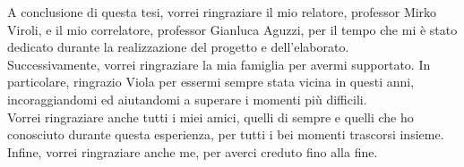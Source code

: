 \documentclass[12pt,a4paper,openright,twoside]{book}
\begin{document}

\backmatter



\begin{acknowledgements}
    A conclusione di questa tesi, vorrei ringraziare il mio relatore, professor Mirko Viroli, e il mio correlatore, professor Gianluca 
    Aguzzi, per il tempo che mi è stato dedicato durante la realizzazione del progetto e dell'elaborato.\\ Successivamente, vorrei ringraziare 
    la mia famiglia per avermi supportato. In particolare, ringrazio Viola per essermi sempre stata vicina in questi anni, incoraggiandomi 
    ed aiutandomi a superare i momenti più difficili.\\ Vorrei ringraziare anche tutti i miei amici, quelli di sempre e quelli 
    che ho conosciuto durante questa esperienza, per tutti i bei momenti trascorsi insieme.\\
    Infine, vorrei ringraziare anche me, per averci creduto fino alla fine.
\end{acknowledgements}
\end{document}
